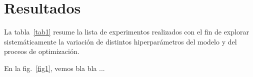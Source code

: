 \documentclass[aps,prl,twocolumn,groupedaddress]{revtex4-2}
\begin{document}
\section{Resultados}

La tabla~\ref{tab1} resume la lista de experimentos realizados con el fin de explorar sistemáticamente la variación de distintos hiperparámetros del modelo y del proceos de optimización.

En la fig.~\ref{fig1}, vemos bla bla ...

%
\end{document}
